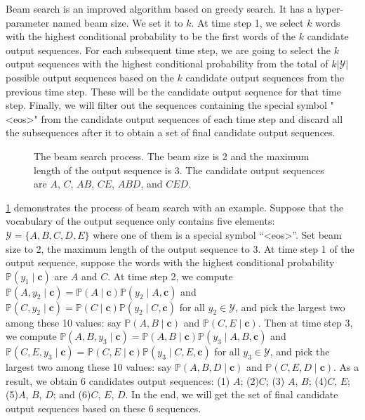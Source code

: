 
Beam search is an improved algorithm based on greedy search. It has a hyper-parameter named beam size. We set it to $k$. At time step 1, we select $k$ words with the highest conditional probability to be the first words of the $k$ candidate output sequences. For each subsequent time step, we are going to select the $k$ output sequences with the highest conditional probability from the total of $k\left|\mathcal{Y}\right|$ possible output sequences based on the $k$ candidate output sequences from the previous time step. These will be the candidate output sequence for that time step. Finally, we will filter out the sequences containing the special symbol "<eos>" from the candidate output sequences of each time step and discard all the subsequences after it to obtain a set of final candidate output sequences.

\begin{figure}[hpt]
	\centering
	
	\caption{The beam search process. The beam size is 2 and the maximum length of the output sequence is 3. The candidate output sequences are $A$, $C$, $AB$, $CE$, $ABD$, and $CED$. }
	\label{fig:beam_search}
\end{figure}

\cref{fig:beam_search} demonstrates the process of beam search with an example. Suppose that the vocabulary of the output sequence only contains five elements: $\mathcal{Y} = \{A, B, C, D, E\}$ where one of them is a special symbol “<eos>”. Set beam size to 2, the maximum length of the output sequence to 3. At time step 1 of the output sequence, suppose the words with the highest conditional probability $\mathbb{P}(y_1 \mid \boldsymbol{c})$ are $A$ and $C$. At time step 2, we compute $\mathbb{P}(A, y_2 \mid \boldsymbol{c}) = \mathbb{P}(A \mid \boldsymbol{c})\mathbb{P}(y_2 \mid A, \boldsymbol{c})$ and $\mathbb{P}(C, y_2 \mid \boldsymbol{c}) = \mathbb{P}(C \mid \boldsymbol{c})\mathbb{P}(y_2 \mid C, \boldsymbol{c})$ for all $y_2 \in \mathcal{Y}$, and pick the largest two among these 10 values: say $\mathbb{P}(A, B \mid \boldsymbol{c})$ and $\mathbb{P}(C, E \mid \boldsymbol{c})$. Then at time step 3, we compute $\mathbb{P}(A, B, y_3 \mid \boldsymbol{c}) = \mathbb{P}(A, B \mid \boldsymbol{c})\mathbb{P}(y_3 \mid A, B, \boldsymbol{c})$ and $\mathbb{P}(C, E, y_3 \mid \boldsymbol{c}) = \mathbb{P}(C, E \mid \boldsymbol{c})\mathbb{P}(y_3 \mid C, E, \boldsymbol{c})$ for all $y_3 \in \mathcal{Y}$, and pick the largest two among these 10 values: say $\mathbb{P}(A, B, D \mid \boldsymbol{c})$ and $\mathbb{P}(C, E, D \mid  \boldsymbol{c})$. As a result, we obtain 6 candidates output sequences: (1) $A$; (2)$C$; (3) $A$, $B$; (4)$C$, $E$; (5)$A$, $B$, $D$; and (6)$C$, $E$, $D$. In the end, we will get the set of final candidate output sequences based on these 6 sequences.

